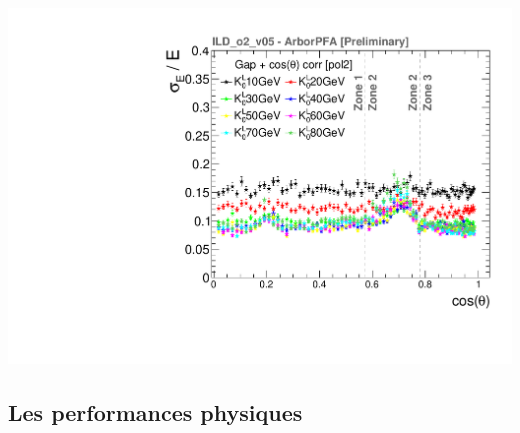 \documentclass[8pt]{beamer}
\begin{document}
\begin{frame}
\begin{minipage}{0.49\linewidth}
\begin{center}
        \includegraphics[width=0.75\linewidth]{EResCorrThetaGapO2_thesis.pdf}
      \end{center}
    \end{minipage}
  \end{frame}


  \subsection{Les performances physiques}
\end{document}
